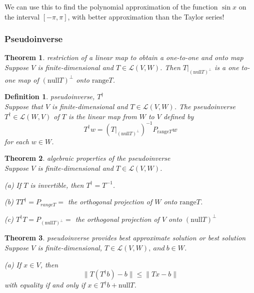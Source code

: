 \documentclass{article}
\newtheorem{theorem}{Theorem}[subsection]
\newtheorem{definition}{Definition}[subsection]
\newcommand{\range}{\text{range}}
\newcommand{\n}{\text{null}}
\begin{document}
\begin{CJK}{UTF8}{gkai}
We can use this to find the polynomial approximation of the function $\sin x$ on the interval $[-\pi,\pi]$, with better approximation than the Taylor series!

\subsubsection{Pseudoinverse}

\begin{theorem}
    restriction of a linear map to obtain a one-to-one and onto map\\

    Suppose $V$ is finite-dimensional and $T \in \mathcal{L}(V,W)$. Then $T|_{(\n T)^\bot}$ is a one to-one map of $(\n T)^\bot$ onto $\range T$.
\end{theorem}

\begin{definition}
    pseudoinverse, $T^\dagger$ \\

    Suppose that $V$ is finite-dimensional and $T \in \mathcal{L}(V,W)$. The pseudoinverse $T^\dagger  \in\mathcal{L}(W,V)$ of $T$ is the linear map from $W$ to $V$ defined by
    \[T^\dagger w =(T|_{(\n T)^\bot})^{-1} P_{\range T} w\]
    for each $w \in W$.
\end{definition}

\begin{theorem}
    algebraic properties of the pseudoinverse\\

    Suppose $V$ is finite-dimensional and $T \in \mathcal{L}(V,W)$.

    (a) If $T$ is invertible, then $T^\dagger = T^{-1}$.

    (b) $T T^\dagger  = P_{rangeT} =$ the orthogonal projection of $W$ onto $\range T$.

    (c) $T^\dagger T = P_{(\n T)^\bot} =$ the orthogonal projection of $V$ onto $(\n T)^\bot$\\
\end{theorem}

\begin{theorem}
    pseudoinverse provides best approximate solution or best solution\\

    Suppose $V$ is finite-dimensional, $T \in \mathcal{L}(V,W), ~and~ b \in W$.

    (a) If $x \in V$, then
    \[\|T(T^\dagger b) -  b\|  \leq \|Tx - b\| \]
    with equality if and only if $x \in T^\dagger b + \n T$.


\end{theorem}
\end{CJK}
\end{document}
